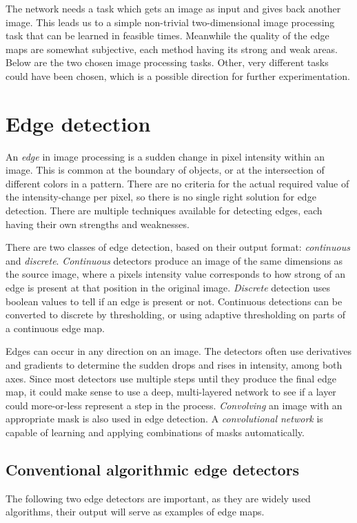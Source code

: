 \documentclass[12pt]{report}
\begin{document}
The network needs a task which gets an image as input and gives back another image. This leads us to a simple non-trivial two-dimensional image processing task that can be learned in feasible times. Meanwhile the quality of the edge maps are somewhat subjective, each method having its strong and weak areas. Below are the two chosen image processing tasks. Other, very different tasks could have been chosen, which is a possible direction for further experimentation.
\section{Edge detection}
An \textit{edge} in image processing is a sudden change in pixel intensity within an image. This is common at the boundary of objects, or at the intersection of different colors in a pattern. There are no criteria for the actual required value of the intensity-change per pixel, so there is no single right solution for edge detection. There are multiple techniques available for detecting edges, each having their own strengths and weaknesses.

There are two classes of edge detection, based on their output format: \textit{continuous} and \textit{discrete}. \textit{Continuous} detectors produce an image of the same dimensions as the source image, where a pixels intensity value corresponds to how strong of an edge is present at that position in the original image. \textit{Discrete} detection uses boolean values to tell if an edge is present or not. Continuous detections can be converted to discrete by thresholding, or using adaptive thresholding on parts of a continuous edge map.

Edges can occur in any direction on an image. The detectors often use derivatives and gradients to determine the sudden drops and rises in intensity, among both axes. Since most detectors use multiple steps until they produce the final edge map, it could make sense to use a deep, multi-layered network to see if a layer could more-or-less represent a step in the process. \textit{Convolving} an image with an appropriate mask is also used in edge detection. A \textit{convolutional network} is capable of learning and applying combinations of masks automatically.
\subsection{Conventional algorithmic edge detectors}
The following two edge detectors are important, as they are widely used algorithms, their output will serve as examples of edge maps.
\end{document}
